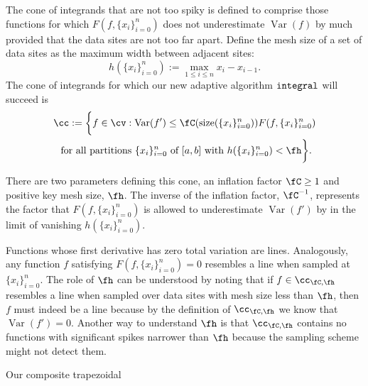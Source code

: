 \documentclass[]{article}
\DeclareMathOperator{\integ}{\texttt{\textup{integral}}}
\DeclareMathOperator{\Var}{Var}
\DeclareMathOperator{\size}{size}
\theoremstyle{definition}
\theoremstyle{remark}
\newcommand{\datasites}{\{x_i\}_{i=0}^n}
\begin{document}
The cone of integrands that are not too spiky is defined to comprise those functions for which $F(f,\datasites)$ does not underestimate $\Var(f)$ by much provided that the data sites are not too far apart.  Define the mesh size of a set of data sites as the maximum width between adjacent  sites:
\[
h(\datasites):=\max_{1 \le i \le n} x_i-x_{i-1}.
\]
The cone of integrands for which our new adaptive algorithm $\integ$ will succeed is 
\begin{multline}
\cc:=\biggl \{f \in \cv : \Var(f') \le \fC(\size(\datasites)) F(f,\datasites)  \\
\text{ for all partitions } \datasites \text{ of } [a,b] \text{ with } h(\datasites) < \fh \biggr \}.
\end{multline}

There are two parameters defining this cone, an inflation factor $\fC \ge 1$ and positive key mesh size, $\fh$.  The inverse of the inflation factor, $\fC^{-1}$, represents the factor that $F(f,\datasites)$ is allowed to underestimate $\Var(f')$ by in the limit of vanishing $h(\datasites)$.  

Functions whose first derivative has zero total variation are lines.  Analogously, any function $f$ satisfying $F(f,\datasites)=0$ resembles a line when sampled at $\datasites$.  The role of $\fh$ can be understood by noting that if $f\in \cc_{\fC,\fh}$ resembles a line when sampled over data sites with mesh size less than $\fh$, then $f$ must indeed be a line because by the definition of $\cc_{\fC,\fh}$ we know that $\Var(f')=0$. Another way to understand $\fh$ is that $\cc_{\fC,\fh}$ contains no functions with significant spikes narrower than $\fh$ because the sampling scheme might not detect them.

Our composite trapezoidal 
\end{document}
